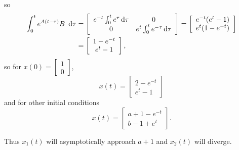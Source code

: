 \documentclass{article}
\begin{document}
so
\begin{align*}
\int_0^t e^{A(t - \tau)} B ~\dif \tau
&= \left[\begin{array}{c c}
     e^{-t}\int_0^t e^\tau \dif \tau & 0 \\
     0                              & e^t \int_0^t e^{-\tau} \dif \tau
   \end{array}\right]
 = \left[\begin{array}{c c}
     e^{-t}(e^t - 1) \\
     e^{t}(1 - e^{-t})
   \end{array}\right] \\
&= \left[\begin{array}{c}
     1 - e^{-t} \\
     e^{t} - 1
   \end{array}\right],
\end{align*}
so for $x(0) = \left[\begin{array}{c} 1 \\ 0 \end{array}\right]$,
$$
x(t) 
= \left[\begin{array}{c}
    2 - e^{-t} \\ e^t - 1
  \end{array}\right]
$$
and for other initial conditions
$$
x(t) 
= \left[\begin{array}{c}
    a + 1 - e^{-t} \\
    b - 1 + e^t
  \end{array}\right].
$$

Thus $x_1(t)$ will asymptotically approach $a + 1$ and
$x_2(t)$ will diverge.

\pagebreak
\end{document}
